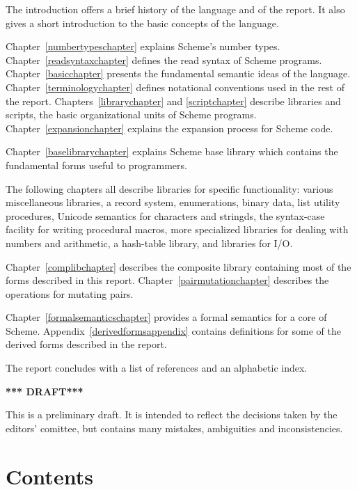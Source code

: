 The introduction offers a brief history of the language and of
the report.  It also gives a short introduction to the basic concepts
of the language.

Chapter~\ref{numbertypeschapter} explains Scheme's number types.
Chapter~\ref{readsyntaxchapter} defines the read syntax of Scheme
programs.  Chapter~\ref{basicchapter} presents the fundamental
semantic ideas of the language.  Chapter~\ref{terminologychapter}
defines notational conventions used in the rest of the report.
Chapters~\ref{librarychapter} and \ref{scriptchapter} describe
libraries and scripts, the basic organizational units of Scheme
programs.  Chapter~\ref{expansionchapter} explains the expansion
process for Scheme code.

Chapter~\ref{baselibrarychapter} explains Scheme base library which
contains the fundamental forms useful to programmers.

The following chapters all describe libraries for specific
functionality: various miscellaneous libraries, a record system,
enumerations, binary data, list utility procedures, Unicode semantics
for characters and stringds, the {\cf syntax-case} facility for
writing procedural macros, more specialized libraries for dealing with
numbers and arithmetic, a hash-table library, and libraries for
I/O.

Chapter~\ref{complibchapter} describes the composite library
containing most of the forms described in this report.
Chapter~\ref{pairmutationchapter} describes the operations for
mutating pairs.

Chapter~\ref{formalsemanticschapter} provides a formal semantics for a
core of Scheme.  Appendix~\ref{derivedformsappendix} contains
definitions for some of the derived forms described in the report.

\vest The report concludes with a list of references and an
alphabetic index.

\begin{center}
{\large \bf
*** DRAFT*** \\
}\end{center}

This is a preliminary draft.  It is intended to reflect the decisions
taken by the editors' comittee, but contains many mistakes,
ambiguities and inconsistencies.

\newpage
\chapter*{Contents}
\addvspace{3.5pt}                  %
\renewcommand{\tocshrink}{-3.5pt}  %
{\footnotesize
\tableofcontents
}

\vfill
\eject

